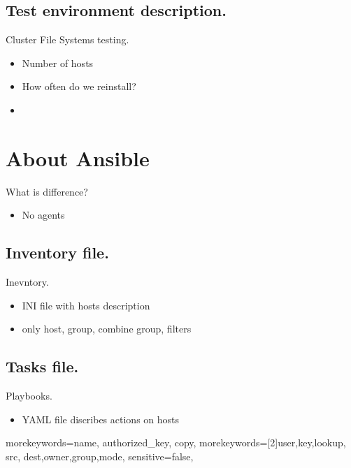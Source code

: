 \documentclass{beamer}
\begin{document}
\subsection{Test environment description.}
\begin{frame}{Cluster File Systems testing.}
  \begin{itemize}
  \item
  Number of hosts
  \item
  How often do we reinstall?
  \item
  \end{itemize}
\end{frame}


\section{About Ansible}
\begin{frame}{What is difference?}
  \begin{itemize}
  \item
  No agents
  \end{itemize}
\end{frame}

\subsection{Inventory file.}
\begin{frame}{Inevntory.}
  \begin{itemize}
  \item
  INI file with hosts description
  \item
  only host, group, combine group, filters 
  \end{itemize}
\end{frame}

\subsection{Tasks file.}
\begin{frame}{Playbooks.}
  \begin{itemize}
  \item
  YAML file discribes actions on hosts
  \end{itemize}
\end{frame}

%
  {morekeywords={name,%
      authorized\_key, copy},%
   morekeywords=[2]{user,key,lookup, src, dest,owner,group,mode},
sensitive=false,
}
\end{document}

